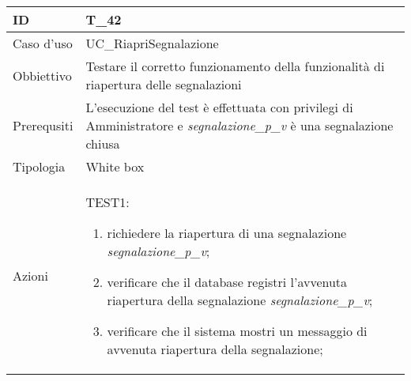 \begin{table}[hb]
    \centering
    \begin{tabular}{ |p{2cm}|p{10cm}|  }
        \hline
        ID          & T\_42                                                                              \\\hline
        Caso d'uso  & UC\_RiapriSegnalazione                                                           \\\hline
        Obbiettivo  & Testare il corretto funzionamento della funzionalità di riapertura delle segnalazioni \\\hline
        Prerequsiti & L'esecuzione del test è effettuata con privilegi di Amministratore e \emph{segnalazione\_p\_v} è una segnalazione chiusa                         \\\hline
        Tipologia   & White box                                                                          \\\hline
        Azioni      &
        TEST1:
        \begin{enumerate}[nosep, topsep=0pt]
            \item richiedere la riapertura di una segnalazione \emph{segnalazione\_p\_v};
            \item verificare che il database registri l'avvenuta riapertura della segnalazione \emph{segnalazione\_p\_v};
            \item verificare che il sistema mostri un messaggio di avvenuta riapertura della segnalazione;
        \end{enumerate}
        \\\hline
    \end{tabular}
\end{table}

